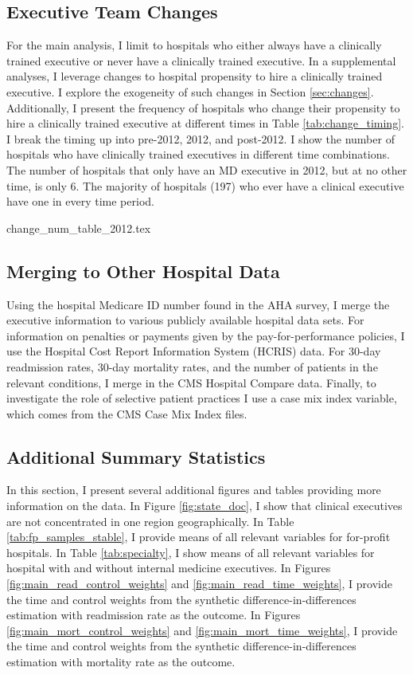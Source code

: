 \documentclass[12pt]{article}
\begin{document}
\subsection{Executive Team Changes}\label{app:changes}

For the main analysis, I limit to hospitals who either always have a clinically trained executive or never have a clinically trained executive. In a supplemental analyses, I leverage changes to hospital propensity to hire a clinically trained executive. I explore the exogeneity of such changes in Section \ref{sec:changes}. Additionally, I present the frequency of hospitals who change their propensity to hire a clinically trained executive at different times in Table \ref{tab:change_timing}. I break the timing up into pre-2012, 2012, and post-2012. I show the number of hospitals who have clinically trained executives in different time combinations. The number of hospitals that only have an MD executive in 2012, but at no other time, is only 6. The majority of hospitals (197) who ever have a clinical executive have one in every time period. 

{change_num_table_2012.tex}


\subsection{Merging to Other Hospital Data}

Using the hospital Medicare ID number found in the AHA survey, I merge the executive information to various publicly available hospital data sets. For information on penalties or payments given by the pay-for-performance policies, I use the Hospital Cost Report Information System (HCRIS) data. For 30-day readmission rates, 30-day mortality rates, and the number of patients in the relevant conditions, I merge in the CMS Hospital Compare data. Finally, to investigate the role of selective patient practices I use a case mix index variable, which comes from the CMS Case Mix Index files. 

\subsection{Additional Summary Statistics}\label{app:sumstats}

In this section, I present several additional figures and tables providing more information on the data. In Figure \ref{fig:state_doc}, I show that clinical executives are not concentrated in one region geographically. In Table \ref{tab:fp_samples_stable}, I provide means of all relevant variables for for-profit hospitals. In Table \ref{tab:specialty}, I show means of all relevant variables for hospital with and without internal medicine executives. In Figures \ref{fig:main_read_control_weights} and \ref{fig:main_read_time_weights}, I provide the time and control weights from the synthetic difference-in-differences estimation with readmission rate as the outcome. In Figures \ref{fig:main_mort_control_weights} and \ref{fig:main_mort_time_weights}, I provide the time and control weights from the synthetic difference-in-differences estimation with mortality rate as the outcome. 
\end{document}
